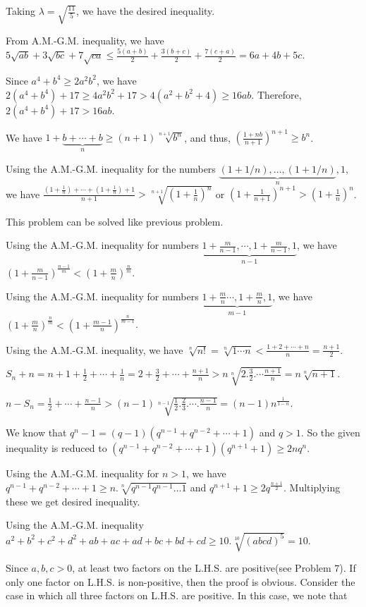   Taking $\lambda = \sqrt{\frac{11}{5}}$, we have the desired inequality.
\item From A.M.-G.M. inequality, we have $5\sqrt{ab} + 3\sqrt{bc} + 7\sqrt{ca}\leq \frac{5(a + b)}{2} +
  \frac{3(b + c)}{2} + \frac{7(c + a)}{2} = 6a + 4b + 5c$.
\item Since $a^4 + b^4\geq 2a^2b^2$, we have $2(a^4 + b^4) + 17\geq 4a^2b^2 + 17 > 4(a^2 + b^2 + 4)\geq
  16ab$. Therefore, $2(a^4 + b^4) + 17 > 16ab$.
\item We have $1 + \underbrace{b + \cdots + b}_{n}\geq (n + 1)\sqrt[n + 1]{b^n}$, and thus, $\left(\frac{1 +
  nb}{n + 1}\right)^{n + 1}\geq b^n$.
\item Using the A.M.-G.M. inequality for the numbers $\underbrace{(1 + 1/n), \ldots, (1 + 1/n)}_{n}, 1$, we
  have $\frac{\left(1 + \frac{1}{n}\right) + \cdots + \left(1 + \frac{1}{n}\right) + 1}{n + 1} > \sqrt[n +
    1]{\left(1 + \frac{1}{n}\right)^n}$ or $\left(1 + \frac{1}{n + 1}\right)^{n + 1} > \left(1 +
  \frac{1}{n}\right)^n$.
\item This problem can be solved like previous problem.
\item Using the A.M.-G.M. inequality for numbers $\underbrace{1 + \frac{m}{n - 1}, \cdots, 1 + \frac{m}{n -
    1}, 1}_{n - 1}$, we have $\left(1 + \frac{m}{n - 1}\right)^{\frac{n - 1}{m}} < \left(1 +
  \frac{m}{n}\right)^{\frac{n}{m}}$.

  Using the A.M.-G.M. inequality for numbers $\underbrace{1 + \frac{m}{n} \cdots, 1 + \frac{m}{n}, 1}_{m -
    1}$, we have $\left(1 + \frac{m}{n}\right)^{\frac{n}{m}} < \left(1 + \frac{m - 1}{n}\right)^{\frac{n}{m
      - 1}}$.
\item Using the A.M.-G.M. inequality, we have $\sqrt[n]{n!} = \sqrt[n]{1\cdots n} < \frac{1 + 2 + \cdots +
  n}{n} = \frac{n + 1}{2}$.
\item $S_n + n = n + 1 + \frac{1}{2} + \cdots + \frac{1}{n} = 2 + \frac{3}{2} + \cdots + \frac{n + 1}{n} >
  n\sqrt[n]{2.\frac{3}{2}.\cdots \frac{n + 1}{n}} = n\sqrt[n]{n + 1}$.
\item $n - S_n = \frac{1}{2} + \cdots + \frac{n - 1}{n} > (n - 1)\sqrt[n -
  1]{\frac{1}{2}.\frac{2}{3}.\cdots.\frac{n - 1}{n}} = (n - 1)n^{\frac{1}{1 - n}}$.
\item We know that $q^n - 1 = (q - 1)(q^{n - 1} + q^{n - 2} + \cdots + 1)$ and $q > 1$. So the given
  inequality is reduced to $(q^{n - 1} + q^{n - 2} + \cdots + 1)(q^{n + 1} + 1) \geq 2nq^n$.

  Using the A.M.-G.M. inequality for $n > 1$, we have $q^{n - 1} + q^{n - 2} + \cdots + 1 \geq n.\sqrt[n]{q^{n -
  1}q^{n - 1}\ldots 1}$ and $q^{n + 1} + 1\geq 2q^{\frac{n + 1}{2}}$. Multiplying these we get desired
  inequality.
\item Using the A.M.-G.M. inequality $a^2 + b^2 + c^2 + d^2 + ab + ac + ad + bc + bd + cd\geq
  10.\sqrt[10]{(abcd)^5} = 10$.
\item Since $a, b, c > 0$, at least two factors on the L.H.S. are positive(see Problem $7$). If only one
  factor on L.H.S. is non-positive, then the proof is obvious. Consider the case in which all three factors
  on L.H.S. are positive. In this case, we note that

